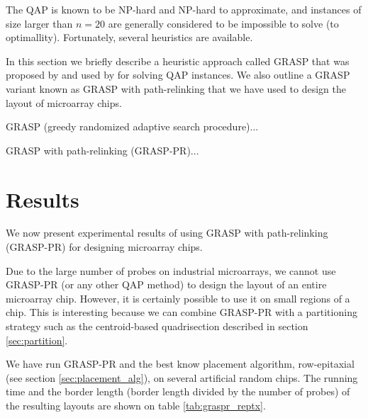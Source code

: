 \documentclass{bioinfo}
\begin{document}
The QAP is known to be NP-hard and NP-hard to approximate, and instances of size larger than $n = 20$ are generally considered to be impossible to solve (to optimallity). Fortunately, several heuristics are available.

In this section we briefly describe a heuristic approach called GRASP that was proposed by \citealp{FEO95} and used by \citealp{LI94} for solving QAP instances. We also outline a GRASP variant known as GRASP with path-relinking \citep{OLIVEIRA04} that we have used to design the layout of microarray chips.

GRASP (greedy randomized adaptive search procedure)...

GRASP with path-relinking (GRASP-PR)...

\section{Results}

We now present experimental results of using GRASP with path-relinking (GRASP-PR) for designing microarray chips.

Due to the large number of probes on industrial microarrays, we cannot use GRASP-PR (or any other QAP method) to design the layout of an entire microarray chip. However, it is certainly possible to use it on small regions of a chip. This is interesting because we can combine GRASP-PR with a partitioning strategy such as the centroid-based quadrisection described in section \ref{sec:partition}.

We have run GRASP-PR and the best know placement algorithm, row-epitaxial (see section \ref{sec:placement_alg}), on several artificial random chips. The running time and the border length (border length divided by the number of probes) of the resulting layouts are shown on table \ref{tab:graspr_reptx}.
\end{document}
